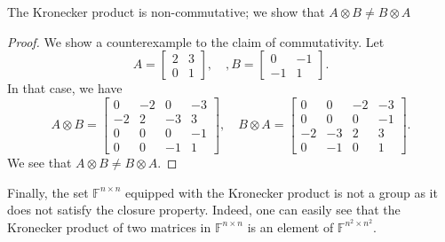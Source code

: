 \documentclass[11pt]{article}
\newcommand{\field}{\mathbb{F}} %
\newcommand{\kp}{\otimes} %
\begin{document}
The Kronecker product is non-commutative; we show that \(A \kp B \neq B \kp A\)

\begin{proof}
We show a counterexample to the claim of commutativity.
Let
\[
A = \begin{bmatrix}
2 & 3 \\ 0 & 1
\end{bmatrix}, \quad, B = \begin{bmatrix}
0 & -1 \\ -1 & 1
\end{bmatrix}.
\]
In that case, we have
\[
A \kp B = \begin{bmatrix}
0 & -2 & 0 & -3 \\
-2 & 2 & -3 & 3 \\
0 & 0 & 0 & -1 \\
0 & 0 & -1 & 1
\end{bmatrix}, \quad B \kp A = \begin{bmatrix}
0 & 0 & -2 & -3 \\
0 & 0 & 0 & -1 \\
-2 & -3 & 2 & 3 \\
0 & -1 & 0 & 1
\end{bmatrix}.
\]
We see that \(A \kp B \neq B \kp A\).
\end{proof}

Finally, the set \(\field^{n \times n}\) equipped with the Kronecker product is not a group as it does not satisfy the closure property. Indeed, one can easily see that the Kronecker product of two matrices in \(\field^{n \times n}\) is an element of \(\field^{n^2 \times n^2}\).
\end{document}
